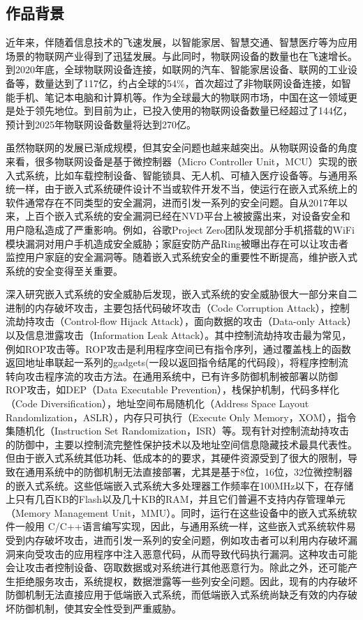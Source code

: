 \documentclass[UTF8,12pt,a4paper]{ctexart}
\numberwithin{figure}{section}
\begin{document}
\subsection{作品背景}
\par 近年来，伴随着信息技术的飞速发展，以智能家居、智慧交通、智慧医疗等为应用场景的物联网产业得到了迅猛发展。与此同时，物联网设备的数量也在飞速增长。到2020年底，全球物联网设备连接，如联网的汽车、智能家居设备、联网的工业设备等，数量达到了117亿，约占全球的54\%，首次超过了非物联网设备连接，如智能手机、笔记本电脑和计算机等。作为全球最大的物联网市场，中国在这一领域更是处于领先地位。到目前为止，已投入使用的物联网设备数量已经超过了144亿，预计到2025年物联网设备数量将达到270亿\cite{StateOfIOT}。
\par 虽然物联网的发展已渐成规模，但其安全问题也越来越突出。从物联网设备的角度来看，很多物联网设备是基于微控制器（Micro Controller Unit，MCU）实现的嵌入式系统，比如车载控制设备、智能锁具、无人机、可植入医疗设备等。与通用系统一样，由于嵌入式系统硬件设计不当或软件开发不当，使运行在嵌入式系统上的软件通常存在不同类型的安全漏洞，进而引发一系列的安全问题。自从2017年以来，上百个嵌入式系统的安全漏洞已经在NVD平台上被披露出来，对设备安全和用户隐私造成了严重影响。例如，谷歌Project Zero团队发现部分手机搭载的WiFi模块漏洞对用户手机造成安全威胁\cite{beniamini2017project}；家庭安防产品Ring被曝出存在可以让攻击者监控用户家庭的安全漏洞等\cite{Amazon}。随着嵌入式系统安全的重要性不断提高，维护嵌入式系统的安全变得至关重要。
\par 深入研究嵌入式系统的安全威胁后发现，嵌入式系统的安全威胁很大一部分来自二进制的内存破坏攻击，主要包括代码破坏攻击（Code Corruption Attack），控制流劫持攻击（Control-flow Hijack Attack），面向数据的攻击（Data-only Attack）以及信息泄露攻击（Information Leak Attack）。其中控制流劫持攻击最为常见，例如ROP攻击等。ROP攻击是利用程序空间已有指令序列，通过覆盖栈上的函数返回地址串联起一系列的gadgets(一段以返回指令结尾的代码段)，将程序控制流转向攻击程序流的攻击方法。在通用系统中，已有许多防御机制被部署以防御ROP攻击，如DEP（Data Executable Prevention），栈保护机制，代码多样化（Code Diversification），地址空间布局随机化（Address Space Layout Randomlization，ASLR），内存只可执行（Execute Only Memory，XOM），指令集随机化（Instruction Set Randomization，ISR）等。现有针对控制流劫持攻击的防御中，主要以控制流完整性保护技术以及地址空间信息隐藏技术最具代表性。但由于嵌入式系统其低功耗、低成本的的要求，其硬件资源受到了很大的限制，导致在通用系统中的防御机制无法直接部署，尤其是基于8位，16位，32位微控制器的嵌入式系统\cite{PositionPaper}。这些低端嵌入式系统大多处理器工作频率在100MHz以下，在存储上只有几百KB的Flash以及几十KB的RAM，并且它们普遍不支持内存管理单元（Memory Management Unit，MMU）。同时，运行在这些设备中的嵌入式系统软件一般用 C/C++语言编写实现，因此，与通用系统一样，这些嵌入式系统软件易受到内存破坏攻击，进而引发一系列的安全问题\cite{roemer2012return}，例如攻击者可以利用内存破坏漏洞来向受攻击的应用程序中注入恶意代码，从而导致代码执行漏洞。这种攻击可能会让攻击者控制设备、窃取数据或对系统进行其他恶意行为。除此之外，还可能产生拒绝服务攻击，系统提权，数据泄露等一些列安全问题。因此，现有的内存破坏防御机制无法直接应用于低端嵌入式系统，而低端嵌入式系统尚缺乏有效的内存破坏防御机制，使其安全性受到严重威胁。
\end{document}
